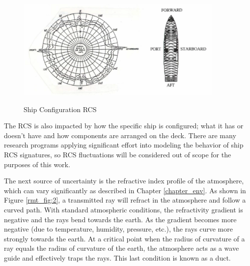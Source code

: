 \begin{figure}[H]
  \begin{center}
\includegraphics[width=4in]{../media/multistatic/shipconfig.png}
  \end{center}
  \renewcommand{\baselinestretch}{1} \small\normalsize
  \begin{quote}
    \caption[Ship Configuration RCS]{Ship Configuration RCS\label{rmt_fig:1}}
  \end{quote}
\end{figure}
\renewcommand{\baselinestretch}{2} \small\normalsize

The RCS is also impacted by how the specific ship is configured; what it has or doesn't have and how components are arranged on the deck. There are many research programs applying significant effort into modeling the behavior of ship RCS signatures, so RCS fluctuations will be considered out of scope for the purposes of this work.

The next source of uncertainty is the refractive index profile of the atmosphere, which can vary significantly as described in Chapter \ref{chapter_env}. As shown in Figure \ref{rmt_fig:2}, a transmitted ray will refract in the atmosphere and follow a curved path. With standard atmospheric conditions, the refractivity gradient is negative and the rays bend towards the earth. As the gradient becomes more negative (due to temperature, humidity, pressure, etc.), the rays curve more strongly towards the earth. At a critical point when the radius of curvature of a ray equals the radius of curvature of the earth, the atmosphere acts as a wave guide and effectively traps the rays. This last condition is known as a duct.

